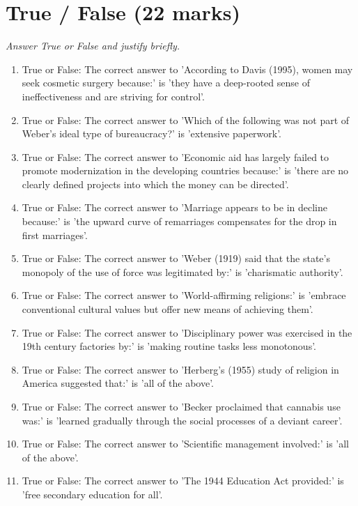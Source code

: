 \documentclass[12pt]{article}
\begin{document}
\section*{True / False (22 marks)}
\textit{Answer True or False and justify briefly.}
\begin{enumerate}[label=\arabic*.]
\item True or False: The correct answer to 'According to Davis (1995), women may seek cosmetic surgery because:' is 'they have a deep-rooted sense of ineffectiveness and are striving for control'.
\item True or False: The correct answer to 'Which of the following was not part of Weber's ideal type of bureaucracy?' is 'extensive paperwork'.
\item True or False: The correct answer to 'Economic aid has largely failed to promote modernization in the developing countries because:' is 'there are no clearly defined projects into which the money can be directed'.
\item True or False: The correct answer to 'Marriage appears to be in decline because:' is 'the upward curve of remarriages compensates for the drop in first marriages'.
\item True or False: The correct answer to 'Weber (1919) said that the state's monopoly of the use of force was legitimated by:' is 'charismatic authority'.
\item True or False: The correct answer to 'World-affirming religions:' is 'embrace conventional cultural values but offer new means of achieving them'.
\item True or False: The correct answer to 'Disciplinary power was exercised in the 19th century factories by:' is 'making routine tasks less monotonous'.
\item True or False: The correct answer to 'Herberg's (1955) study of religion in America suggested that:' is 'all of the above'.
\item True or False: The correct answer to 'Becker proclaimed that cannabis use was:' is 'learned gradually through the social processes of a deviant career'.
\item True or False: The correct answer to 'Scientific management involved:' is 'all of the above'.
\item True or False: The correct answer to 'The 1944 Education Act provided:' is 'free secondary education for all'.
\end{enumerate}
\end{document}

